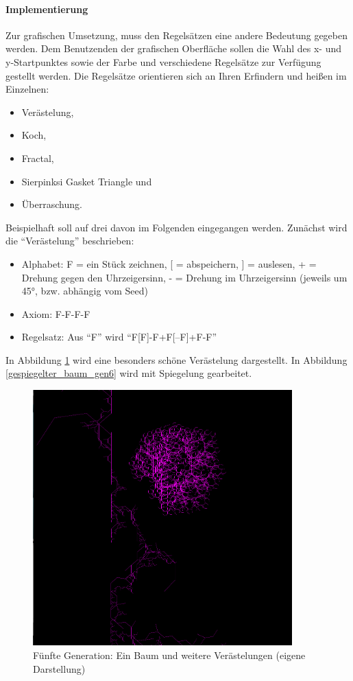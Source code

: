 \documentclass[../mciAusarbeitung.tex]{subfiles}
\begin{document}
\paragraph{Implementierung}
Zur grafischen Umsetzung, muss den Regelsätzen eine andere Bedeutung gegeben werden. Dem Benutzenden der grafischen Oberfläche sollen die Wahl des x- und y-Startpunktes sowie der Farbe und verschiedene Regelsätze zur Verfügung gestellt werden. Die Regelsätze orientieren sich an Ihren Erfindern und heißen im Einzelnen:
\begin{itemize}
\item Verästelung,
\item Koch,
\item Fractal,
\item Sierpinksi Gasket Triangle und
\item Überraschung.
\end{itemize}
Beispielhaft soll auf drei davon im Folgenden eingegangen werden. Zunächst wird die "`Verästelung"' beschrieben:
\begin{itemize}
\item Alphabet: F = ein Stück zeichnen, [ = abspeichern, ] = auslesen, + = Drehung gegen den Uhrzeigersinn, - = Drehung im Uhrzeigersinn (jeweils um 45°, bzw. abhängig vom Seed)
\item Axiom: F-F-F-F
\item Regelsatz: Aus "`F"' wird "`F[F]-F+F[--F]+F-F"'
\end{itemize}

In Abbildung \ref{veraestelung_gen5} wird eine besonders schöne Verästelung dargestellt. In Abbildung \ref{gespiegelter_baum_gen6} wird mit Spiegelung gearbeitet.
\begin{figure}[H]
\includegraphics[width=10cm]{img/veraestelung_gen5.png}
\caption{Fünfte Generation: Ein Baum und weitere Verästelungen (eigene Darstellung)}
\label{veraestelung_gen5}
\end{figure}
\end{document}
